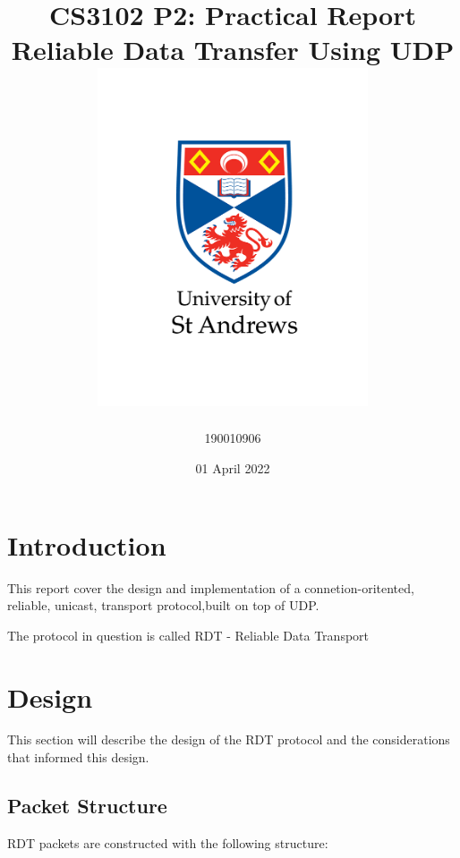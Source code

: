 \documentclass[12pt]{article}
\title{
{CS3102 P2: Practical Report}\\
{\large Reliable Data Transfer Using UDP}\\
{\includegraphics[width=80mm]{university-logo.png}}
}
\author{190010906}
\date{01 April 2022}
\begin{document}
\maketitle

\section{Introduction}

This report cover the design and implementation of a connetion-oritented, reliable, unicast, transport protocol,built on top of UDP.

The protocol in question is called RDT - Reliable Data Transport

\section{Design}

This section will describe the design of the RDT protocol and the considerations that informed this design.

\subsection{Packet Structure}

RDT packets are constructed with the following structure:
\end{document}
